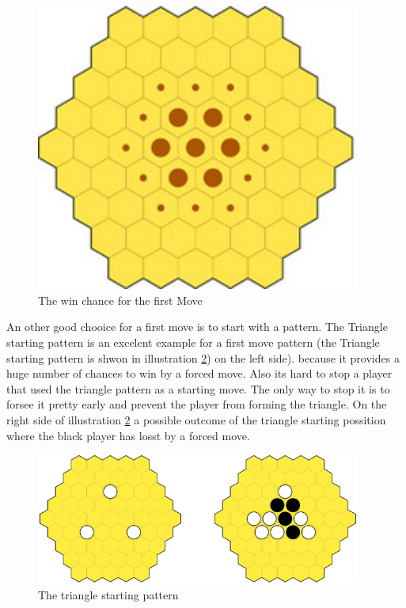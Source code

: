\documentclass[english]{report}
\begin{document}
\begin{figure}[ht]
\centering
\includegraphics[width=0.95\textwidth]{Abbildungen/yav_winChance.png}
\caption[The win chance for the first Move, Source:\cite{yvalath}]{The win chance for the first Move}
\label{fig:yav_winChance}
\end{figure}


An other good chooice for a first move is to start with a pattern. The Triangle starting pattern is an excelent example for a first move pattern (the Triangle starting pattern is shwon in illustration \ref{fig:yav_triangle}) on the left side). because it provides a huge number of chances to win by a forced move. Also its hard to stop a player that used the triangle pattern as a starting move. The only way to stop it is to forsee it pretty early and prevent the player from forming the triangle.
On the right side of illustration \ref{fig:yav_triangle} a possible outcome of the triangle starting possition where the black player has losst by a forced move.\cite{yvalath}

\begin{figure}[ht]
\centering
\includegraphics[width=0.95\textwidth]{Abbildungen/yav_triangle.png}
\caption[The triangle starting pattern, Source:\cite{yvalath}]{The triangle starting pattern}
\label{fig:yav_triangle}
\end{figure}
\end{document}
